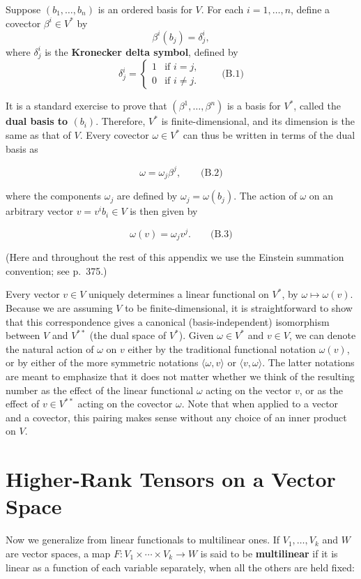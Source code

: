 Suppose $(b_1,\ldots,b_n)$ is an ordered basis for $V$. For each $i = 1,\ldots,n$, define a covector $\beta^i \in V^*$ by
\[
\beta^i(b_j) = \delta^i_j,
\]
where $\delta^i_j$ is the \textbf{Kronecker delta symbol}, defined by
\[
\delta^i_j = \begin{cases} 1 & \text{if } i = j, \\ 0 & \text{if } i \ne j. \end{cases} \qquad \text{(B.1)}
\]

It is a standard exercise to prove that $(\beta^1,\ldots,\beta^n)$ is a basis for $V^*$, called the \textbf{dual basis to $(b_i)$}. Therefore, $V^*$ is finite-dimensional, and its dimension is the same as that of $V$. Every covector $\omega \in V^*$ can thus be written in terms of the dual basis as

\[
\omega = \omega_j \beta^j, \qquad \text{(B.2)}
\]

where the components $\omega_j$ are defined by $\omega_j = \omega(b_j)$. The action of $\omega$ on an arbitrary vector $v = v^i b_i \in V$ is then given by

\[
\omega(v) = \omega_j v^j. \qquad \text{(B.3)}
\]

(Here and throughout the rest of this appendix we use the Einstein summation convention; see p.~375.)

Every vector $v \in V$ uniquely determines a linear functional on $V^*$, by $\omega \mapsto \omega(v)$. Because we are assuming $V$ to be finite-dimensional, it is straightforward to show that this correspondence gives a canonical (basis-independent) isomorphism between $V$ and $V^{**}$ (the dual space of $V^*$). Given $\omega \in V^*$ and $v \in V$, we can denote the natural action of $\omega$ on $v$ either by the traditional functional notation $\omega(v)$, or by either of the more symmetric notations $\langle\omega, v\rangle$ or $\langle v, \omega\rangle$. The latter notations are meant to emphasize that it does not matter whether we think of the resulting number as the effect of the linear functional $\omega$ acting on the vector $v$, or as the effect of $v \in V^{**}$ acting on the covector $\omega$. Note that when applied to a vector and a covector, this pairing makes sense without any choice of an inner product on $V$.

\section{Higher-Rank Tensors on a Vector Space}

Now we generalize from linear functionals to multilinear ones. If $V_1,\ldots,V_k$ and $W$ are vector spaces, a map $F: V_1 \times \cdots \times V_k \to W$ is said to be \textbf{multilinear} if it is linear as a function of each variable separately, when all the others are held fixed:

